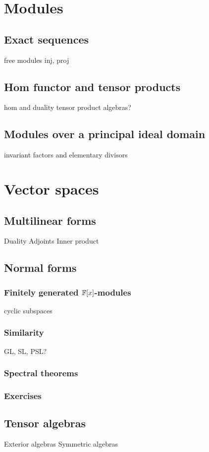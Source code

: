 \documentclass{../note}
\begin{document}
\part{Modules}

\chapter{Exact sequences}
free modules
inj, proj

\chapter{Hom functor and tensor products}
hom and duality
tensor product
algebras?

\chapter{Modules over a principal ideal domain}
invariant factors and elementary divisors

















\part{Vector spaces}


\chapter{Multilinear forms}
Duality
Adjoints
Inner product




\chapter{Normal forms}
\section{Finitely generated $\mathbb{F}[x]$-modules}
cyclic subspaces

\section{Similarity}
GL, SL, PSL? %


\section{Spectral theorems}



\section*{Exercises}


\chapter{Tensor algebras}
Exterior algebras
Symmetric algebras
\end{document}
